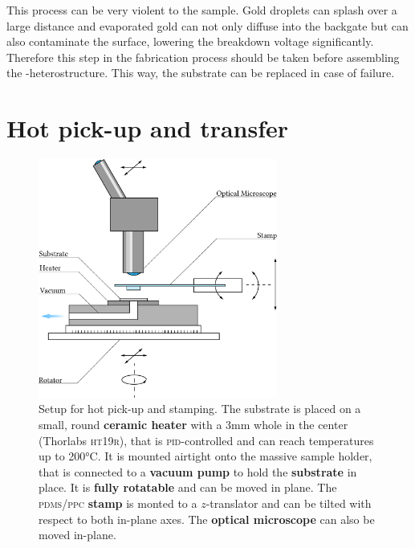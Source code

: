 This process can be very violent to the sample. Gold droplets can splash over a large distance and evaporated gold can not only diffuse into the backgate but can also contaminate the \sio surface, lowering the breakdown voltage significantly. Therefore this step in the fabrication process should be taken before assembling the \tmd-\hbng heterostructure. This way, the substrate can be replaced in case of failure.

\section{Hot pick-up and transfer}\label{hot_pickup}

\begin{figure}
	\centering
	\includegraphics[width=0.7\textwidth]{Stempelaufbau.png}

	\caption{Setup for hot pick-up and stamping. The substrate is placed on a small, round \textbf{ceramic heater} with a 3mm whole in the center (Thorlabs \textsc{ht19r}), that is \textsc{pid}-controlled and can reach temperatures up to 200°C. It is mounted airtight onto the massive sample holder, that is connected to a \textbf{vacuum pump} to hold the \textbf{substrate} in place. It is \textbf{fully rotatable} and can be moved in plane. The \textsc{pdms/ppc} \textbf{stamp} is monted to a $z$-translator and can be tilted with respect to both in-plane axes. The \textbf{optical microscope} can also be moved in-plane.}
	\label{stamping-setup}
\end{figure}


